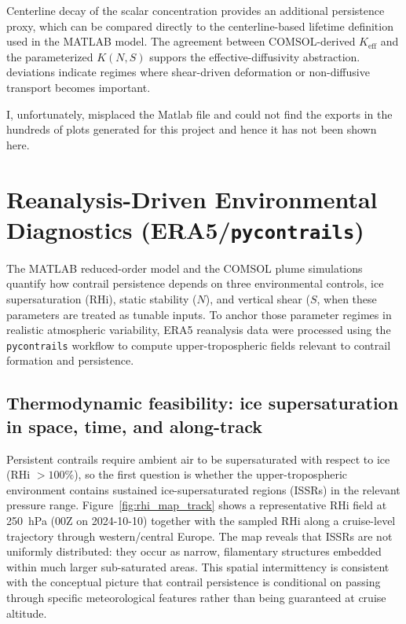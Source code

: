 \documentclass[11pt]{article}
\begin{document}
Centerline decay of the scalar concentration provides an additional persistence proxy,
which can be compared directly to the centerline-based lifetime definition used in the
MATLAB model. The agreement between COMSOL-derived $K_{\mathrm{eff}}$ and the parameterized
$K(N,S)$ suppors the effective-diffusivity abstraction. deviations indicate regimes
where shear-driven deformation or non-diffusive transport becomes important.

I, unfortunately, misplaced the Matlab file and could not find the exports in the hundreds of plots generated for this project and hence it has not been shown here. 

\section{Reanalysis-Driven Environmental Diagnostics (ERA5/\texttt{pycontrails})}
\label{sec:pycontrails_era5}

The MATLAB reduced-order model and the COMSOL plume simulations quantify how contrail persistence
depends on three environmental controls, ice supersaturation (RHi), static stability ($N$), and
vertical shear ($S$, when these parameters are treated as tunable inputs. To anchor those
parameter regimes in realistic atmospheric variability, ERA5 reanalysis data were processed using
the \texttt{pycontrails} workflow to compute upper-tropospheric fields relevant to contrail
formation and persistence. 

\subsection{Thermodynamic feasibility: ice supersaturation in space, time, and along-track}
\label{subsec:rhi_results}

Persistent contrails require ambient air to be supersaturated with respect to ice (RHi $>100\%$),
so the first question is whether the upper-tropospheric environment contains sustained
ice-supersaturated regions (ISSRs) in the relevant pressure range. Figure~\ref{fig:rhi_map_track}
shows a representative RHi field at 250~hPa (00Z on 2024-10-10) together with the sampled RHi along
a cruise-level trajectory through western/central Europe. The map reveals that ISSRs are not
uniformly distributed: they occur as narrow, filamentary structures embedded within much larger
sub-saturated areas. This spatial intermittency is consistent with the conceptual picture that
contrail persistence is conditional on passing through specific meteorological features rather
than being guaranteed at cruise altitude.
\end{document}
